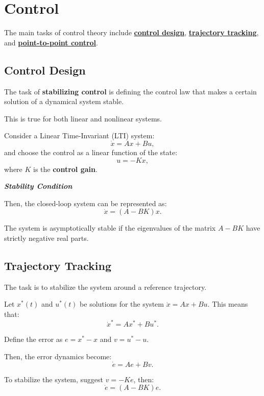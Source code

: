 \section{Control}

The main tasks of control theory include \textbf{\underline{control design}}, \textbf{\underline{trajectory tracking}}, and \textbf{\underline{point-to-point control}}.


\subsection*{Control Design}

\begin{tcolorbox}[colback=green!10,colframe=green!50!black,title=\textbf{Dynamical Systems}]
    The task of \textbf{stabilizing control} is defining the control law that makes a certain solution of 
    a dynamical system stable.
\end{tcolorbox}

This is true for both linear and nonlinear systems.

Consider a Linear Time-Invariant (LTI) system:
\[\dot{x} = Ax + Bu,\]
and choose the control as a linear function of the state:
\[u = -Kx,\] where \(K\) is the \textbf{control gain}.

\begin{center}
    \textbf{\textit{Stability Condition}}
\end{center}

Then, the closed-loop system can be represented as:
\[\dot{x} = (A - BK)x.\]

The system is asymptotically stable if the eigenvalues of the matrix \(A - BK\) have strictly negative real parts.

\subsection*{Trajectory Tracking}

The task is to stabilize the system around a reference trajectory.

Let \(x^*(t)\) and \(u^*(t)\) be solutions for the system \(\dot{x} = Ax + Bu\). This means that:
\[\dot{x}^* = Ax^* + Bu^*.\]

Define the error as \(e = x^* - x\) and \(v = u^* - u\).

Then, the error dynamics become:
\[\dot{e} = Ae + Bv.\]

To stabilize the system, suggest \(v = -Ke\), then:
\[\dot{e} = (A - BK)e.\]

